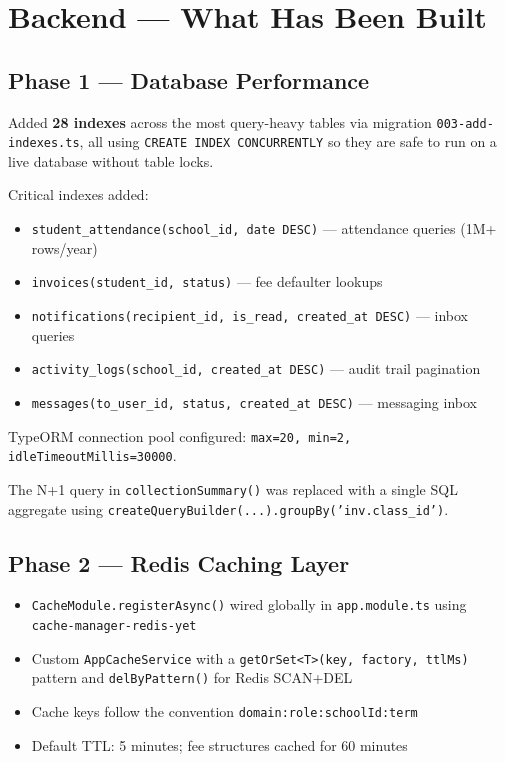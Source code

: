 \documentclass[11pt, a4paper]{article}
\newcommand{\code}[1]{\texttt{\small #1}}
\begin{document}
\section{Backend --- What Has Been Built}

\subsection{Phase 1 --- Database Performance}

Added \textbf{28 indexes} across the most query-heavy tables via
migration \code{003-add-indexes.ts}, all using \code{CREATE INDEX CONCURRENTLY}
so they are safe to run on a live database without table locks.

Critical indexes added:

\begin{itemize}[leftmargin=1.5em, itemsep=0pt]
  \item \code{student\_attendance(school\_id, date DESC)} --- attendance queries (1M+ rows/year)
  \item \code{invoices(student\_id, status)} --- fee defaulter lookups
  \item \code{notifications(recipient\_id, is\_read, created\_at DESC)} --- inbox queries
  \item \code{activity\_logs(school\_id, created\_at DESC)} --- audit trail pagination
  \item \code{messages(to\_user\_id, status, created\_at DESC)} --- messaging inbox
\end{itemize}

TypeORM connection pool configured: \code{max=20, min=2, idleTimeoutMillis=30000}.

The N+1 query in \code{collectionSummary()} was replaced with a single SQL
aggregate using \code{createQueryBuilder(...).groupBy('inv.class\_id')}.

\subsection{Phase 2 --- Redis Caching Layer}

\begin{itemize}[leftmargin=1.5em, itemsep=0pt]
  \item \code{CacheModule.registerAsync()} wired globally in \code{app.module.ts}
    using \code{cache-manager-redis-yet}
  \item Custom \code{AppCacheService} with a \code{getOrSet<T>(key, factory, ttlMs)}
    pattern and \code{delByPattern()} for Redis SCAN+DEL
  \item Cache keys follow the convention \code{domain:role:schoolId:term}
  \item Default TTL: 5 minutes; fee structures cached for 60 minutes
\end{itemize}
\end{document}

